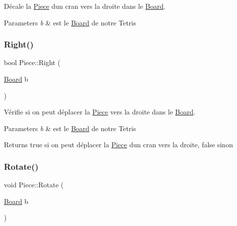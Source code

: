 Décale la \hyperlink{classPiece}{Piece} d\textquotesingle{}un cran vers la droite dans le \hyperlink{classBoard}{Board}. 


\begin{DoxyParams}{Parameters}
{\em b} & est le \hyperlink{classBoard}{Board} de notre Tetris \\
\hline
\end{DoxyParams}
\mbox{\label{classPiece_a44d684a99ea99db740b5bfa73f37ab15}} 
\subsubsection{\texorpdfstring{Right()}{Right()}}
{\footnotesize\ttfamily bool Piece\+::\+Right (\begin{DoxyParamCaption}\item[{\hyperlink{classBoard}{Board}}]{b }\end{DoxyParamCaption})}



Vérifie si on peut déplacer la \hyperlink{classPiece}{Piece} vers la droite dans le \hyperlink{classBoard}{Board}. 


\begin{DoxyParams}{Parameters}
{\em b} & est le \hyperlink{classBoard}{Board} de notre Tetris \\
\hline
\end{DoxyParams}
\begin{DoxyReturn}{Returns}
true si on peut déplacer la \hyperlink{classPiece}{Piece} d\textquotesingle{}un cran vers la droite, false sinon 
\end{DoxyReturn}
\mbox{\label{classPiece_a078f3cc6281cb8f60af3ae2266c651ba}} 
\subsubsection{\texorpdfstring{Rotate()}{Rotate()}}
{\footnotesize\ttfamily void Piece\+::\+Rotate (\begin{DoxyParamCaption}\item[{\hyperlink{classBoard}{Board}}]{b }\end{DoxyParamCaption})\hspace{0.3cm}{\ttfamily [pure virtual]}}



